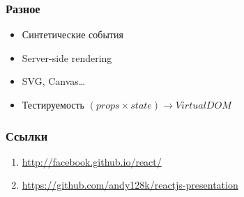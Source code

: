 \documentclass[10pt,utf8]{beamer}
\begin{document}
\begin{frame}[fragile]
  \frametitle{Разное}

  \begin{itemize}
  \item Синтетические события
    \pause
  \item Server-side rendering
    \pause
  \item SVG, Canvas\dots
    \pause
  \item Тестируемость $(props \times state) \rightarrow Virtual DOM$
  \end{itemize}
\end{frame}

\begin{frame}[fragile]
  \frametitle{Ссылки}

  \begin{enumerate}
  \item \href{http://facebook.github.io/react/}{http://facebook.github.io/react/}
  \item \href{https://github.com/andy128k/reactjs-presentation}{https://github.com/andy128k/reactjs-presentation}
  \end{enumerate}
\end{frame}
\end{document}
